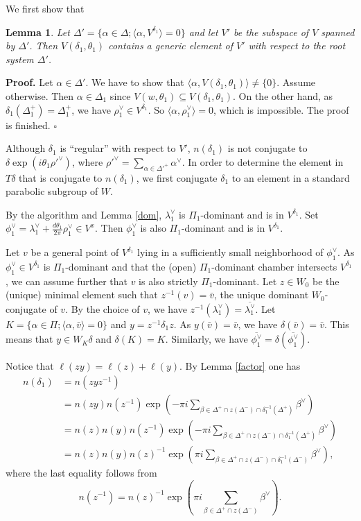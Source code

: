 \documentclass[10pt,leqno]{article}
\newtheorem{lemma}[equation]{Lemma}
\newcommand{\qed}{\hfill $\square$ \medskip}
\newenvironment{proof}[1][Proof]{\noindent\textbf{#1.} }{\qed}
\renewcommand{\a}{\mathfrak a}
\def\a{\alpha}
\def\b{\beta}
\def\d{\delta}
\def\th{\theta}
\def\l{\lambda}
\def\i{^{-1}}
\begin{document}
We first show that

\begin{lemma}
	Let $\Delta'=\{\a \in \Delta; \langle\a, V^{\d_1}\rangle=0\}$ and let $V'$ be the subspace of $V$ spanned by $\Delta'$. Then $V(\d_1, \th_1)$ contains a generic element of $V'$ with respect to the root system $\Delta'$.
\end{lemma}
\begin{proof}
	Let $\a \in \Delta'$. We have to show that $\langle\a, V(\d_1, \th_1)\rangle \neq \{0\}$. Assume otherwise. Then $\a \in \Delta_1$ since $V(w, \th_1) \subseteq V(\d_1, \th_1)$. On the other hand, as $\d_1(\Delta_1^+) = \Delta_1^+$, we have $\rho_1^\vee \in V^{\d_1}$. So $\langle\a, \rho_1^\vee \rangle = 0$, which is impossible. The proof is finished.
\end{proof}

Although $\d_1$ is ``regular'' with respect to $V'$, $n(\d_1)$ is not conjugate to $\d \exp(i \th_1 {\rho'}^\vee)$, where ${\rho'}^\vee=\sum_{\a \in {\Delta'}^+} \a^\vee$. In order to determine the element in $T \d$ that is conjugate to $n(\d_1)$, we first conjugate $\d_1$ to an element in a standard parabolic subgroup of $W$.

By the algorithm and Lemma \ref{dom}, $\l_1^\vee$ is $\Pi_1$-dominant and is in $V^{\d_1}$. Set $\phi_1^\vee = \l_1^\vee + \frac{d \th_1}{2 \pi}\rho_1^\vee \in V^x$. Then $\phi_1^\vee$ is also $\Pi_1$-dominant and is in $V^{\d_1}$.

Let $v$ be a general point of $V^{\d_1}$ lying in a sufficiently small neighborhood of $\phi_1^\vee$. As $\phi_1^\vee \in V^{\d_1}$ is $\Pi_1$-dominant and that the (open) $\Pi_1$-dominant chamber intersects $V^{\d_1}$, we can assume further that $v$ is also strictly $\Pi_1$-dominant. Let $z \in W_0$ be the (unique) minimal element such that $z\i(v) = \bar v$, the unique dominant $W_0$-conjugate of $v$. By the choice of $v$, we have $z^{-1}(\l_1^\vee)=\overline{\l_1^\vee}$. Let $K=\{\a \in \Pi; \langle\a, \bar v\rangle=0\}$ and $y = z^{-1} \d_1 z$. As $y(\bar v)=\bar v$, we have $\d(\bar v)=\bar v$. This means that $y \in W_K \d$ and $\d(K)=K$. Similarly, we have $\overline{\phi_1^\vee} = \d(\overline{\phi_1^\vee})$.

Notice that $\ell(z y)=\ell(z) + \ell(y)$. By Lemma \ref{factor} one has
\begin{align*}
n(\d_1) &= n(z y z^{-1}) \\ &=
n(z y) n(z^{-1})\exp(-\pi i\sum_{\b \in \Delta^+ \cap z(\Delta^-) \cap \d_1 \i (\Delta^+)}  \b^\vee) \\
&= n(z) n(y) n(z^{-1}) \exp(-\pi i\sum_{\b \in \Delta^+ \cap z(\Delta^-) \cap \d_1 \i (\Delta^+)} \b^\vee)\\
&= n(z) n(y) n(z)^{-1}\exp(\pi i\sum_{\b \in \Delta^+ \cap z(\Delta^-) \cap \d_1 \i(\Delta^-)}  \b^\vee),
\end{align*} where the last equality follows from $$n(z^{-1})=n(z)^{-1}\exp(\pi i\sum_{\b \in \Delta^+ \cap z(\Delta^-)} \b^\vee).$$
\end{document}
